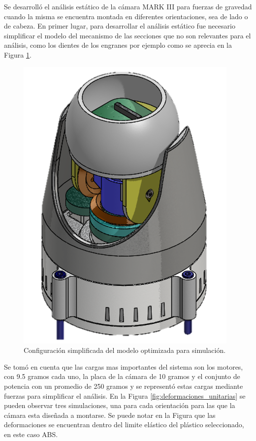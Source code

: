     Se desarrolló el análisis estático de la cámara MARK III para fuerzas de gravedad cuando la misma se encuentra montada en diferentes orientaciones, sea de lado o de cabeza. 
    En primer lugar, para desarrollar el análisis estático fue necesario simplificar el modelo del mecanismo de las secciones que no son relevantes para el análisis, como los dientes de los engranes por ejemplo como se aprecia en la Figura \ref{fig:configuracionSimplificada}.
    
    \begin{figure}[H]
    \centering
    \begin{adjustbox}{width=\linewidth/2} \includegraphics{media/analisisEstatico/configuracionSimplificdaSimulacion.png}
    \end{adjustbox}
    \caption{\label{fig:configuracionSimplificada}Configuración simplificada del modelo optimizada para simulación.}
    \end{figure} 
    
    Se tomó en cuenta que las cargas mas importantes del sistema son los motores, con 9.5 gramos cada uno, la placa de la cámara de 10 gramos y el conjunto de potencia con un promedio de 250 gramos y se representó estas cargas mediante fuerzas para simplificar el análisis. En la Figura \ref{fig:deformaciones_unitarias} se pueden observar tres simulaciones, una para cada orientación para las que la cámara esta diseñada a montarse. Se puede notar en la Figura que las deformaciones se encuentran dentro del limite elástico del plástico seleccionado, en este caso ABS. 
    
